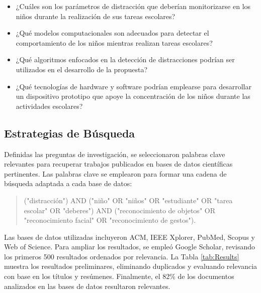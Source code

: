 \documentclass[a4paper,fleqn]{cas-sc}
\begin{document}
			\begin{itemize}
				\item ¿Cuáles son los parámetros de distracción que deberían monitorizarse en los niños durante la realización de sus tareas escolares?
				\item ¿Qué modelos computacionales son adecuados para detectar el comportamiento de los niños mientras realizan tareas escolares?
				\item ¿Qué algoritmos enfocados en la detección de distracciones podrían ser utilizados en el desarrollo de la propuesta?
				\item ¿Qué tecnologías de hardware y software podrían emplearse para desarrollar un dispositivo prototipo que apoye la concentración de los niños durante las actividades escolares?
			\end{itemize}
		
		\subsection{Estrategias de Búsqueda}
			Definidas las preguntas de investigación, se seleccionaron palabras clave relevantes para recuperar trabajos publicados en bases de datos científicas pertinentes. Las palabras clave se emplearon para formar una cadena de búsqueda adaptada a cada base de datos: 
		
			\begin{quote}
				("distracción") AND ("niño" OR "niños" OR "estudiante" OR "tarea escolar" OR "deberes") AND ("reconocimiento de objetos" OR "reconocimiento facial" OR "reconocimiento de gestos").
			\end{quote}
			
			Las bases de datos utilizadas incluyeron ACM, IEEE Xplorer, PubMed, Scopus y Web of Science. Para ampliar los resultados, se empleó Google Scholar, revisando los primeros 500 resultados ordenados por relevancia. La Tabla \ref{tab:Results} muestra los resultados preliminares, eliminando duplicados y evaluando relevancia con base en los títulos y resúmenes. Finalmente, el 82\% de los documentos analizados en las bases de datos resultaron relevantes.
			
\end{document}
